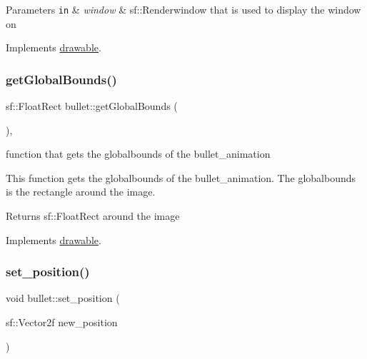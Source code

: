 \begin{DoxyParams}[1]{Parameters}
\mbox{\tt in}  & {\em window} & sf\+::\+Renderwindow that is used to display the window on \\
\hline
\end{DoxyParams}


Implements \hyperlink{classdrawable_a4e49e2c1121704c83ce24c5f48dd910f}{drawable}.

\mbox{\label{classbullet_a87bda5887249e8e37c5579180449bd93}} 
\subsubsection{\texorpdfstring{get\+Global\+Bounds()}{getGlobalBounds()}}
{\footnotesize\ttfamily sf\+::\+Float\+Rect bullet\+::get\+Global\+Bounds (\begin{DoxyParamCaption}{ }\end{DoxyParamCaption})\hspace{0.3cm}{\ttfamily [override]}, {\ttfamily [virtual]}}



function that gets the globalbounds of the bullet\+\_\+animation 

This function gets the globalbounds of the bullet\+\_\+animation. The globalbounds is the rectangle around the image.

\begin{DoxyReturn}{Returns}
sf\+::\+Float\+Rect around the image 
\end{DoxyReturn}


Implements \hyperlink{classdrawable_ae013ac0be47538be9ce885d6642daf73}{drawable}.

\mbox{\label{classbullet_af338da31bfb1dd4b2d942ca67316350a}} 
\subsubsection{\texorpdfstring{set\+\_\+position()}{set\_position()}}
{\footnotesize\ttfamily void bullet\+::set\+\_\+position (\begin{DoxyParamCaption}\item[{sf\+::\+Vector2f}]{new\+\_\+position }\end{DoxyParamCaption})}



